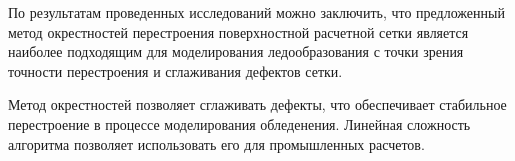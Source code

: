 По результатам проведенных исследований можно заключить, что предложенный метод окрестностей перестроения поверхностной расчетной сетки является наиболее подходящим для моделирования ледообразования с точки зрения точности перестроения и сглаживания дефектов сетки.

Метод окрестностей позволяет сглаживать дефекты, что обеспечивает стабильное перестроение в процессе моделирования обледенения.
Линейная сложность алгоритма позволяет использовать его для промышленных расчетов.

